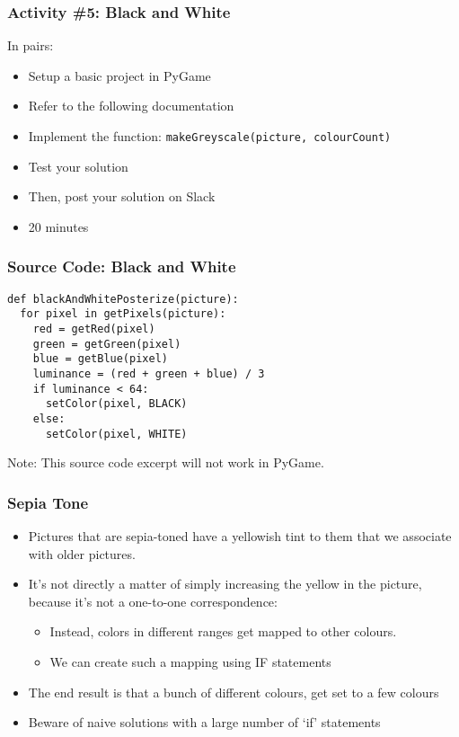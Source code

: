 \begin{frame}
	\frametitle{Activity \#5: Black and White}
	
	In pairs:
	
	\vspace{2em}
	
	\begin{itemize}		
		\item Setup a basic project in PyGame
		\item Refer to the following documentation
		\item Implement the function: \texttt{makeGreyscale(picture, colourCount)}
		\item Test your solution
		\item Then, post your solution on Slack
		\item 20 minutes
	\end{itemize}
\end{frame}

\begin{frame}[fragile]
	\frametitle{Source Code: Black and White}
	
\begin{lstlisting}
def blackAndWhitePosterize(picture):
  for pixel in getPixels(picture):
    red = getRed(pixel)
    green = getGreen(pixel)
    blue = getBlue(pixel)
    luminance = (red + green + blue) / 3
    if luminance < 64:
      setColor(pixel, BLACK)
    else:
      setColor(pixel, WHITE)
\end{lstlisting}

Note: This source code excerpt will not work in PyGame.

\end{frame}

\begin{frame}
	\frametitle{Sepia Tone}
	
	\begin{itemize}		
		\item Pictures that are sepia-toned have a yellowish tint to them that we associate with older pictures.
		\item It's not directly a matter of simply increasing the yellow in the picture, because it's not a one-to-one correspondence:
		\begin{itemize}
			\item Instead, colors in different ranges get mapped to other colours.
			\item We can create such a mapping using IF statements
		\end{itemize}	
		\item The end result is that a bunch of different colours, get set to a few colours
		\item Beware of naive solutions with a large number of `if' statements
	\end{itemize}
\end{frame}

